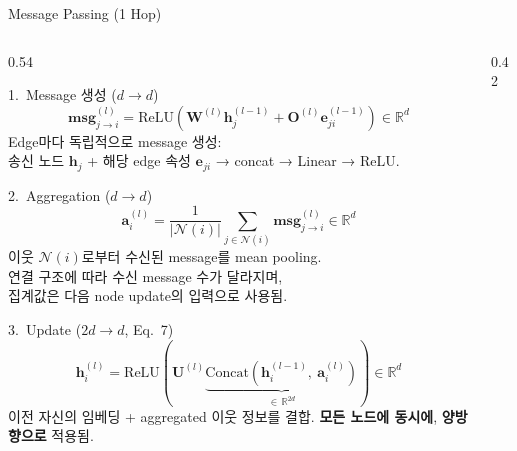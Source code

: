 \documentclass[
11pt,notheorems,hyperref={pdfauthor=whatever}
]{beamer}
\begin{document}
\begin{frame}{Message Passing (1 Hop)}
\begin{columns}[c]

\begin{column}{0.54\textwidth}

    \begin{block}{1.\ Message 생성 \quad ($d \to d$)}
    {\small\[
        \mathbf{msg}_{j \to i}^{(l)}
        = \text{ReLU}\!\left(
            \mathbf{W}^{(l)} \mathbf{h}_j^{(l-1)}
            + \mathbf{O}^{(l)} \mathbf{e}_{ji}^{(l-1)}
        \right) \in \mathbb{R}^d
    \]}
    \footnotesize
    Edge마다 독립적으로 message 생성:\\
    송신 노드 $\mathbf{h}_j$ + 해당 edge 속성 $\mathbf{e}_{ji}$ → concat → Linear → ReLU.
    \end{block}

    \begin{block}{2.\ Aggregation \quad ($d \to d$)}
    {\small\[
        \mathbf{a}_i^{(l)}
        = \frac{1}{|\mathcal{N}(i)|}
          \sum_{j \in \mathcal{N}(i)} \mathbf{msg}_{j \to i}^{(l)} \in \mathbb{R}^d
    \]}
    \footnotesize
    이웃 $\mathcal{N}(i)$로부터 수신된 message를 mean pooling.\\
    연결 구조에 따라 수신 message 수가 달라지며,\\
    집계값은 다음 node update의 입력으로 사용됨.
    \end{block}

    \begin{block}{3.\ Update \quad ($2d \to d$, Eq.\ 7)}
    {\small\[
        \mathbf{h}_i^{(l)}
        = \text{ReLU}\!\left(\mathbf{U}^{(l)}
          \underbrace{\text{Concat}\!\left(\mathbf{h}_i^{(l-1)},\ \mathbf{a}_i^{(l)}\right)}_{\in\,\mathbb{R}^{2d}}\right) \in \mathbb{R}^d
    \]}
    \footnotesize
    이전 자신의 임베딩 + aggregated 이웃 정보를 결합.
    \textbf{모든 노드에 동시에}, \textbf{양방향으로} 적용됨.
    \end{block}

\end{column}

\begin{column}{0.42\textwidth}
    \centering
\end{column}
\end{columns}
\end{frame}
\end{document}

